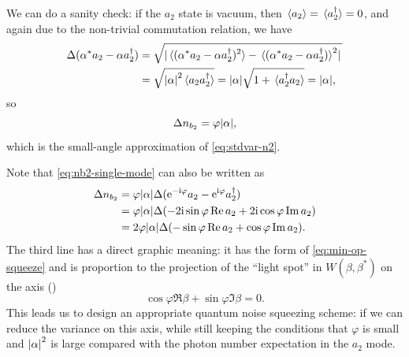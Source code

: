 \documentclass[hyperref, a4paper]{article}
\newcommand*{\ii}{\mathrm{i}}
\newcommand*{\ee}{\mathrm{e}}
\begin{document}
We can do a sanity check:
if the $a_2$ state is vacuum,
then $\expval*{a_2} = \expval*{a_2^\dagger} = 0$, 
and again due to the non-trivial commutation relation, we have 
\begin{equation}
    \begin{aligned}
        \Delta (\alpha^* a_2 - \alpha a_2^\dagger)
        &= \sqrt{ \abs*{\expval*{ (\alpha^* a_2 - \alpha a_2^\dagger)^2 } 
        - \expval*{(\alpha^* a_2 - \alpha a_2^\dagger)}^2} } \\
        &= \sqrt{
            \abs{\alpha}^2 \expval*{a_2 a_2^\dagger}
        } 
        = \abs{\alpha} \sqrt{ 1 + \expval*{a^\dagger_2 a_2} } = \abs{\alpha},
    \end{aligned}
\end{equation}
so 
\begin{equation}
    \Delta n_{b_2} = \varphi \abs{\alpha},
\end{equation}
which is the small-angle approximation of \eqref{eq:stdvar-n2}.

Note that \eqref{eq:nb2-single-mode} can also be written as  
\begin{equation}
    \begin{aligned}
        \Delta n_{b_2} &= \varphi \abs{\alpha} \Delta (\ee^{- \ii \varphi} a_2 - \ee^{\ii \varphi} a_2^\dagger)  \\
        &= \varphi \abs{\alpha} \Delta ( - 2 \ii \sin \varphi \Re a_2 + 2 \ii \cos \varphi \Im a_2 ) \\
        &= 2 \varphi \abs{\alpha} \Delta (- \sin \varphi \Re a_2 + \cos \varphi \Im a_2 ).
    \end{aligned}
    \label{eq:nb2-axis}
\end{equation}
The third line has a direct graphic meaning:
it has the form of \eqref{eq:min-op-squeeze}
and is proportion to the projection of the ``light spot'' in $W(\beta, \beta^*)$
on the axis ()
\begin{equation}
    \cos \varphi \Re \beta + \sin \varphi \Im \beta = 0.
    \label{eq:measure-axis}
\end{equation}
This leads us to design an appropriate quantum noise squeezing scheme:
if we can reduce the variance on this axis,
while still keeping the conditions that $\varphi$ is small and 
$\abs{\alpha}^2$ is large compared with the photon number expectation in the $a_2$ mode.
\end{document}
